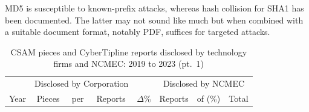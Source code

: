 \documentclass[nonacm,screen]{acmart}
\newcommand\hidden[1]{}
\begin{document}
\begin{itemize}
MD5 is susceptible to known-prefix attacks, whereas hash collision for SHA1 has
been documented. The latter may not sound like much but when combined with a
suitable document format, notably PDF, suffices for targeted attacks.





















\hidden{
Meta's piece counts do not account
for WhatsApp, whereas NCMEC's report counts do. The denominators for pieces per
report are the platform's report counts, except for Meta and Microsoft, which
use NCMEC's report counts.

\newpage

To determine which technology firms to include in this survey, we included all
non-Chinese social media platforms that made it onto Buffer's list of popular
platforms since 2022 and, since NCMEC's disclosures did not distinguish between
platforms owned by the same corporation until 2021, distilled that list to
corporate parents. We also checked NCMEC's disclosures for any other platforms
with more than 100,000 reports or 0.3\%.
}


\begin{table}
\centering\libertineLF

\caption{CSAM pieces and CyberTipline reports disclosed by technology firms and NCMEC: 2019 to 2023 (pt.\ 1)}
\label{tab:pieces-and-reports-1}

\begin{tabular}{r@{\hskip 1.5em}rrr r@{\hskip 1.5em}rrr}
\toprule
& \multicolumn{3}{c}{Disclosed by Corporation}
& \hspace{3.5em}
& \multicolumn{3}{c}{Disclosed by NCMEC} \\
\cmidrule{2-4}\cmidrule{6-8}

Year
& \multicolumn{1}{c}{Pieces}
& \multicolumn{1}{c}{per}
& \multicolumn{1}{c}{Reports}
& \multicolumn{1}{c}{$\Delta$\%}
& \multicolumn{1}{c}{Reports}
& \multicolumn{1}{c}{of (\%)}
& \multicolumn{1}{c}{Total}\\[2ex]


\end{tabular}
\end{table}
\end{itemize}
\end{document}
